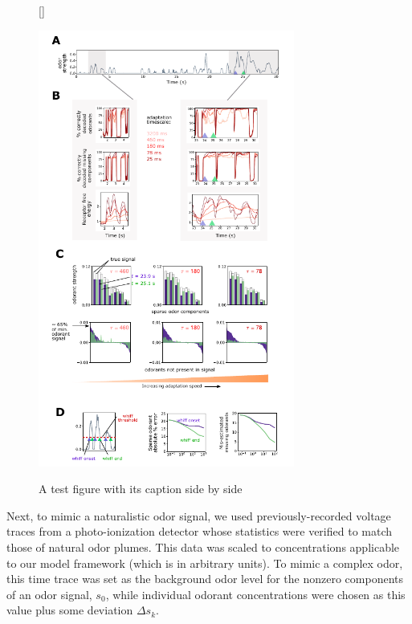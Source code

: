 


\begin{figure}
	[\FBwidth]
	{\caption{A test figure with its caption side by side}\label{fig:temporal_coding}}
	{\includegraphics[width=0.75\textwidth]{figures/Figures_temporal_coding}}
\end{figure}

Next, to mimic a naturalistic odor signal, we used previously-recorded voltage traces from a photo-ionization detector whose statistics were verified to match those of natural odor plumes. This data was scaled to concentrations applicable to our model framework (which is in arbitrary units). To mimic a complex odor, this time trace was set as the background odor level for the nonzero components of an odor signal, $s_0$, while individual odorant concentrations were chosen as this value plus some deviation $\Delta s_k$. 

